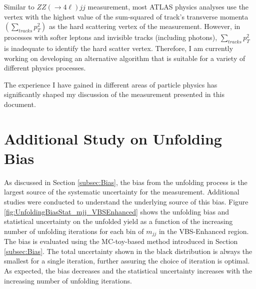 Similar to $ZZ(\rightarrow 4\ell)jj$ measurement, most ATLAS physics analyses use the vertex with the highest value of the sum-squared of track's transverse momenta $(\sum_{tracks}{p_{T}^2})$ as the hard scattering vertex of the measurement. However, in processes with softer leptons and invisible tracks (including photons), $\sum_{tracks}{p_{T}^2}$ is inadequate to identify the hard scatter vertex. Therefore, I am currently working on developing an alternative algorithm that is suitable for a variety of different physics processes. 

The experience I have gained in different areas of particle physics has significantly shaped my discussion of the measurement presented in this document.  

\section{Additional Study on Unfolding Bias}
\label{Appendix:Unfolding_bias}
As discussed in Section \ref{subsec:Bias}, the bias from the unfolding process is the largest source of the systematic uncertainty for the measurement. Additional studies were conducted to understand the underlying source of this bias. Figure \ref{fig:UnfoldingBiasStat_mjj_VBSEnhanced} shows the unfolding bias and statistical uncertainty on the unfolded yield as a function of the increasing number of unfolding iterations for each bin of $m_{jj}$ in the VBS-Enhanced region. The bias is evaluated using the MC-toy-based method introduced in Section \ref{subsec:Bias}. The total uncertainty shown in the black distribution is always the smallest for a single iteration, further assuring the choice of iteration is optimal. As expected, the bias decreases and the statistical uncertainty increases with the increasing number of unfolding iterations.

